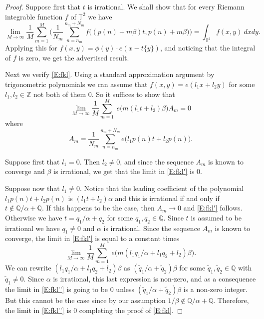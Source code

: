 \documentclass[11pt]{amsart}
\newcommand{\T}{\mathbb{T}}
\newcommand{\Q}{\mathbb{Q}}
\newcommand{\Z}{\mathbb{Z}}
\theoremstyle{plain}
\theoremstyle{definition}
\theoremstyle{remark}
\begin{document}
\begin{proof}
  Suppose first that $t$ is irrational.
 We shall show that for every Riemann integrable function
 $f$ of $\T^2 $ we have
\begin{equation}\label{E:fkl}
\lim_{M\to\infty}\frac{1}{M}\sum_{m=1}^M\Big(
\frac{1}{N_m}\sum_{n=n_m}^{n_m+N_m}
f\big((p(n)+m\beta)t,p(n)+m\beta\big)\Big)=\int_{\T^2} f(x,y)\ dx  dy.
\end{equation}
Applying this for $f(x,y)=\phi(y)\cdot e(x-t\{y\})$, and noticing that
the integral of $f$ is zero, we  get the advertised result.

Next we verify \eqref{E:fkl}.
Using  a standard approximation argument by trigonometric
 polynomials we can assume that $f(x,y)=e(l_1x+l_2y)$ for some $l_1,l_2\in \Z$
 not both of them $0$. So it suffices to show that
 \begin{equation}\label{E:fkl'}
\lim_{M\to\infty}\frac{1}{M}\sum_{m=1}^M
\ e\big(m(l_1t+l_2)\beta\big)A_m=0
\end{equation}
where
$$
A_m=\frac{1}{N_m}\sum_{n=n_m}^{n_m+N_m}
e\big(l_1p(n)t+l_2p(n)\big).
$$

Suppose first that $l_1=0$. Then $l_2\neq 0$, and  since the sequence $A_m$ is known to converge and  $\beta$ is irrational, we get that  the limit in \eqref{E:fkl'} is $0$.

Suppose now that $l_1\neq 0$. Notice that the leading coefficient of the polynomial
  $l_1p(n)t+l_2p(n)$ is $(l_1t+l_2)\alpha$ and this is irrational
  if and only if $t\notin \mathbb{Q}/\alpha+\mathbb{Q}$. If this happens to be the case,
 then
$A_m\to 0$ and \eqref{E:fkl'} follows. Otherwise we have $t=q_1/\alpha+q_2$  for some $q_1,q_2\in \Q$. Since $t$ is assumed to be irrational we have $q_1\neq 0$ and $\alpha$ is irrational. Since the sequence $A_m$ is known to converge,  the limit in \eqref{E:fkl'} is equal to a constant times
\begin{equation}\label{E:fkl''}
\lim_{M\to\infty}\frac{1}{M}\sum_{m=1}^M
\ e\big(m(l_1q_1/\alpha+l_1q_2+l_2)\beta\big).
\end{equation}
We can rewrite $(l_1q_1/\alpha+l_1q_2+l_2)\beta$
as $(\tilde{q}_1/\alpha
+\tilde{q}_2)\beta$ for some $\tilde{q}_1, \tilde{q}_2\in \Q$ with $\tilde{q}_1\neq 0$.
Since $\alpha$ is irrational, this last expression is non-zero,  and as a consequence the limit
in \eqref{E:fkl''} is going to   be $0$ unless $(\tilde{q}_1/\alpha
+\tilde{q}_2)\beta$ is a non-zero integer. But this cannot be the case since by our assumption
$1/\beta \notin \mathbb{Q}/ \alpha+\mathbb{Q}$. Therefore, the limit
in \eqref{E:fkl''} is  $0$ completing the proof of \eqref{E:fkl}.





\end{proof}
\end{document}
